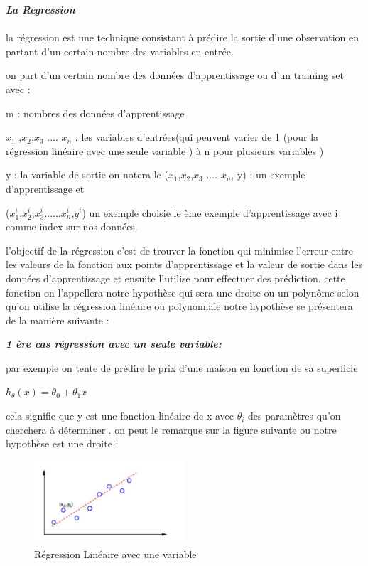 \begin{center}
	\textit{ \textbf{\Large{La Regression}  } }
\end{center}
\paragraph{}
la régression est une technique consistant à prédire la sortie  d'une    observation en partant d'un certain nombre des variables  en entrée.

on part d'un certain nombre des données  d'apprentissage ou  d'un training set 
avec :

m :  nombres des données d'apprentissage

${x}_{1}$ ,${x}_{2}$,${x}_{3}$ .... ${x}_{n}$ : les variables d'entrées(qui peuvent varier de 1 (pour la régression linéaire avec une seule variable ) à n pour plusieurs variables  )

y : la variable  de sortie
on notera le (${x}_{1}$,${x}_{2}$,${x}_{3}$ .... ${x}_{n}$, y) : un exemple d'apprentissage
et

(${x}_{1}^{i}$,${x}_{2}^{i}$,${x}_{3}^{i}$......${x}_{n}^{i}$,${y}^{i}$)  un exemple choisie le ème exemple d'apprentissage avec  i comme index sur nos données.

l'objectif de la régression c'est de trouver la fonction qui minimise l'erreur entre les valeurs de la fonction aux points d'apprentissage et la valeur de sortie dans les données d'apprentissage  et ensuite l'utilise pour effectuer des prédiction.
cette fonction on l'appellera notre hypothèse qui sera une droite ou un polynôme selon qu'on utilise la régression linéaire ou polynomiale 
notre hypothèse se présentera de la manière suivante :

\textbf{\emph{1 ère cas régression avec un seule variable: }} 

par exemple on tente de prédire le prix d'une maison en fonction de sa superficie

${h}_{\theta}\left(x\right)={\theta }_{0}+{\theta }_{1}x$

cela signifie que  y est une fonction linéaire de x avec ${\theta }_{i}$ des paramètres qu'on cherchera à déterminer .
on peut le remarque sur la figure suivante ou notre hypothèse est une droite :
\begin{figure}[ht]
	\centering
	\includegraphics[width=0.5\textwidth]{fig/regressionLineaire1var.png}
	\caption[Short caption]{Régression Linéaire avec une variable}
	\label{fig:imageGraph}
\end{figure}

